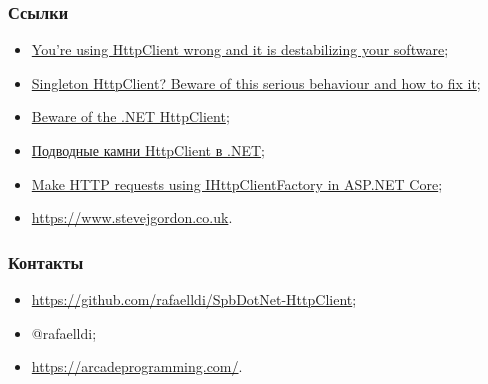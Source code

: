 \documentclass[17pt,aspectratio=169]{beamer}
\begin{document}
\begin{frame}
\frametitle{Ссылки}
\begin{itemize}
	\item \href{https://aspnetmonsters.com/2016/08/2016-08-27-httpclientwrong/}{You're using HttpClient wrong and it is destabilizing your software};
	\item \href{https://byterot.blogspot.com/2016/07/singleton-httpclient-dns.html}{Singleton HttpClient? Beware of this serious behaviour and how to fix it};
	\item \href{https://nima-ara-blog.azurewebsites.net/beware-of-the-net-httpclient/}{Beware of the .NET HttpClient};
	\item \href{https://habr.com/en/post/424873/}{Подводные камни HttpClient в .NET};
	\item \href{https://docs.microsoft.com/en-us/aspnet/core/fundamentals/http-requests?view=aspnetcore-2.2}{Make HTTP requests using IHttpClientFactory in ASP.NET Core};
	\item \href{https://www.stevejgordon.co.uk}{https://www.stevejgordon.co.uk}.
\end{itemize}
\end{frame}

\begin{frame}
\frametitle{Контакты}
\begin{itemize}
	\item \href{Слайды и примеры https://github.com/rafaelldi/SpbDotNet-HttpClient}{https://github.com/rafaelldi/SpbDotNet-HttpClient};
	\item @rafaelldi;
	\item \href{https://arcadeprogramming.com/}{https://arcadeprogramming.com/}.
\end{itemize}
\end{frame}
\end{document}

